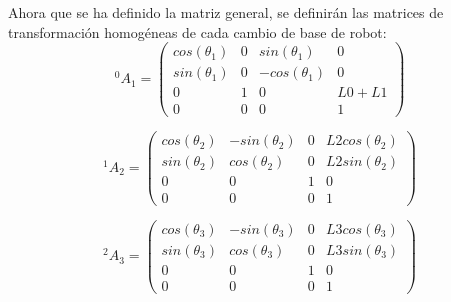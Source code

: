 	Ahora que se ha definido la matriz general, se definirán las matrices de transformación homogéneas de cada cambio de base de robot: \\
	
	\[ {^0}A_{1} =
	\left( \begin{array}{cccc}
	cos(\theta_{1}) &  0 &  sin(\theta_{1}) & 0  \\ 
	sin(\theta_{1}) &  0 & -cos(\theta_{1}) & 0  \\
	0		&  1 &		 0 			& L0+L1 \\
	0		&  0 & 		 0			& 1
	\end{array} \right) \]
	
	\[ {^1}A_{2} =
	\left( \begin{array}{cccc}
	cos(\theta_{2}) & -sin(\theta_{2}) & 0 & L2cos(\theta_{2}) \\ 
	sin(\theta_{2}) & cos(\theta_{2})  & 0 & L2sin(\theta_{2})  \\
	0 		 	   & 			0 			& 1	& 		0 			 \\
	0		 	   &			 0			& 0	& 		1
	\end{array} \right) \]
	
	\[ {^2}A_{3} =
	\left( \begin{array}{cccc}
	cos(\theta_{3}) &  -sin(\theta_{3}) &  0 & L3cos(\theta_{3})   \\ 
	sin(\theta_{3}) &  cos(\theta_{3}) &  0 & L3sin(\theta_{3})   \\
	0 					 &  0 &  				1 					  & 0 \\
	0 					 &  0 & 				 0					  & 1
	\end{array} \right) \]
	
